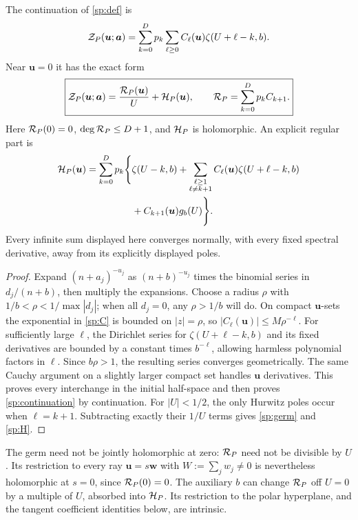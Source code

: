 \begin{theorem}
\label{sp:thm:germ}
The continuation of \eqref{sp:def} is
\begin{equation}\label{sp:continuation}
 \mathcal Z_P(\boldsymbol u;\boldsymbol a)
   =\sum_{k=0}^D p_k\sum_{\ell\ge0}
          C_\ell(\boldsymbol u)\zeta(U+\ell-k,b).
\end{equation}
Near $\boldsymbol u=0$ it has the exact form
\begin{equation}\label{sp:germ}
 \boxed{\mathcal Z_P(\boldsymbol u;\boldsymbol a)
             =\frac{\mathcal R_P(\boldsymbol u)}U+\mathcal H_P(\boldsymbol u),
 \qquad \mathcal R_P=\sum_{k=0}^D p_k C_{k+1}.}
\end{equation}
Here $\mathcal R_P(0)=0$, $\deg\mathcal R_P\le D+1$, and $\mathcal H_P$ is holomorphic.
An explicit regular part is
\begin{align}\label{sp:H}
 \mathcal H_P(\boldsymbol u)=\sum_{k=0}^D p_k\Bigg\{&\zeta(U-k,b)
   +\sum_{\substack{\ell\ge1\\\ell\ne k+1}}
            C_\ell(\boldsymbol u)\zeta(U+\ell-k,b)\notag\\
   &+C_{k+1}(\boldsymbol u)g_b(U)\Bigg\}.
\end{align}
Every infinite sum displayed here converges normally, with every fixed
spectral derivative, away from its explicitly displayed poles.
\end{theorem}

\begin{proof}
Expand $(n+a_j)^{-u_j}$ as $(n+b)^{-u_j}$ times the binomial series
in $d_j/(n+b)$, then multiply the expansions. Choose a radius $\rho$
with $1/b<\rho<1/\max|d_j|$; when all $d_j=0$, any $\rho>1/b$
will do. On compact $\boldsymbol u$-sets the exponential in
\eqref{sp:C} is bounded on $|z|=\rho$, so
$|C_\ell(\boldsymbol u)|\le M\rho^{-\ell}$.
For sufficiently large $\ell$, the Dirichlet series for
$\zeta(U+\ell-k,b)$ and its fixed derivatives are bounded by a
constant times $b^{-\ell}$, allowing harmless polynomial factors in
$\ell$. Since $b\rho>1$, the resulting series converges geometrically.
The same Cauchy argument on a slightly larger compact set handles
$\boldsymbol u$ derivatives. This proves every interchange in the
initial half-space and then proves \eqref{sp:continuation} by continuation.
For $|U|<1/2$, the only Hurwitz poles occur when $\ell=k+1$.
Subtracting exactly their $1/U$ terms gives \eqref{sp:germ} and
\eqref{sp:H}.
\end{proof}

The germ need not be jointly holomorphic at zero: $\mathcal R_P$ need not
be divisible by $U$. Its restriction to every ray
$\boldsymbol u=s\boldsymbol w$ with $W:=\sum_jw_j\ne0$ is nevertheless
holomorphic at $s=0$, since $\mathcal R_P(0)=0$. The auxiliary $b$ can change
$\mathcal R_P$ off $U=0$ by a multiple of $U$, absorbed into $\mathcal H_P$.
Its restriction to the polar hyperplane, and the tangent coefficient
identities below, are intrinsic.

